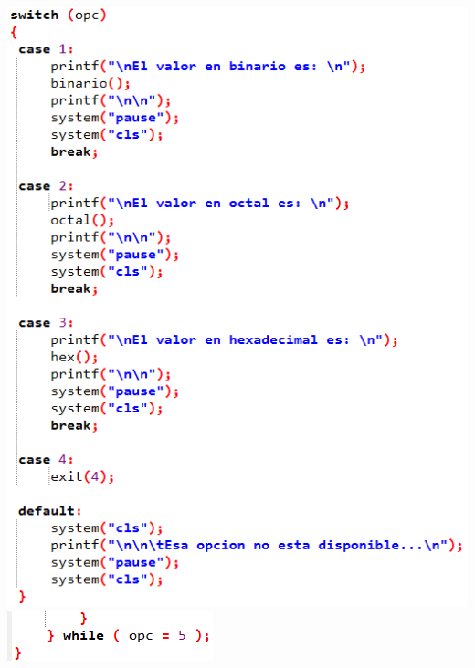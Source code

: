 \documentclass[conference]{IEEEtran}
\begin{document}
\includegraphics{e5} \\
\includegraphics{e6} \\
\end{document}
